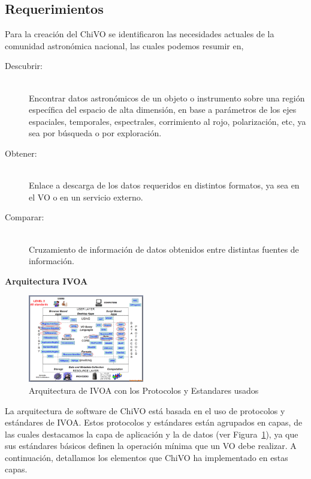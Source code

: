\subsection{Requerimientos}

Para la creación del ChiVO se identificaron las necesidades actuales de la comunidad
astronómica nacional, las cuales podemos resumir en,

\begin{description}
    \item[Descubrir:] \hfill \\
        Encontrar datos astronómicos de un objeto o instrumento sobre una región
        específica del espacio de alta dimensión, en base a parámetros de los ejes
        espaciales, temporales, espectrales, corrimiento al rojo, polarización, etc,
        ya sea por búsqueda o por exploración.
    \item[Obtener:] \hfill \\
        Enlace a descarga de los datos requeridos en distintos formatos, ya sea en
        el VO o en un servicio externo.
    \item[Comparar:] \hfill \\
        Cruzamiento de información de datos obtenidos entre distintas fuentes de
        información.
\end{description}

\textbf{Arquitectura IVOA}


\begin{figure}[ht]
    \centering
    \includegraphics[width=0.45\textwidth]{images/arquitectura_2.png}
    \caption{Arquitectura de IVOA con los Protocolos y Estandares usados}
    \label{fig:ivoarch}
\end{figure}


La arquitectura de software de ChiVO está basada en el uso de protocolos y estándares de
IVOA. Estos protocolos y estándares están agrupados en capas, de las cuales
destacamos la capa de aplicación y la de datos (ver Figura~\ref{fig:ivoarch}),
ya que sus estándares básicos definen la operación mínima que un VO debe
realizar. A continuación, detallamos los elementos que ChiVO ha implementado
en estas capas.

